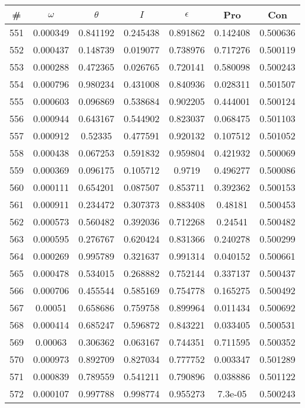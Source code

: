 \newpage
\begin{table}
\begin{tabular}{c|c|c|c|c|c|c}
\# & $\omega$ & $\theta$ & $I$ & $\epsilon$ & Pro & Con\\
\hline
551 & 0.000349 & 0.841192 & 0.245438 & 0.891862 & 0.142408 & 0.500636\\
552 & 0.000437 & 0.148739 & 0.019077 & 0.738976 & 0.717276 & 0.500119\\
553 & 0.000288 & 0.472365 & 0.026765 & 0.720141 & 0.580098 & 0.500243\\
554 & 0.000796 & 0.980234 & 0.431008 & 0.840936 & 0.028311 & 0.501507\\
555 & 0.000603 & 0.096869 & 0.538684 & 0.902205 & 0.444001 & 0.500124\\
556 & 0.000944 & 0.643167 & 0.544902 & 0.823037 & 0.068475 & 0.501103\\
557 & 0.000912 & 0.52335 & 0.477591 & 0.920132 & 0.107512 & 0.501052\\
558 & 0.000438 & 0.067253 & 0.591832 & 0.959804 & 0.421932 & 0.500069\\
559 & 0.000369 & 0.096175 & 0.105712 & 0.9719 & 0.496277 & 0.500086\\
560 & 0.000111 & 0.654201 & 0.087507 & 0.853711 & 0.392362 & 0.500153\\
561 & 0.000911 & 0.234472 & 0.307373 & 0.883408 & 0.48181 & 0.500453\\
562 & 0.000573 & 0.560482 & 0.392036 & 0.712268 & 0.24541 & 0.500482\\
563 & 0.000595 & 0.276767 & 0.620424 & 0.831366 & 0.240278 & 0.500299\\
564 & 0.000269 & 0.995789 & 0.321637 & 0.991314 & 0.040152 & 0.500661\\
565 & 0.000478 & 0.534015 & 0.268882 & 0.752144 & 0.337137 & 0.500437\\
566 & 0.000706 & 0.455544 & 0.585169 & 0.754778 & 0.165275 & 0.500492\\
567 & 0.00051 & 0.658686 & 0.759758 & 0.899964 & 0.011434 & 0.500692\\
568 & 0.000414 & 0.685247 & 0.596872 & 0.843221 & 0.033405 & 0.500531\\
569 & 0.00063 & 0.306362 & 0.063167 & 0.744351 & 0.711595 & 0.500352\\
570 & 0.000973 & 0.892709 & 0.827034 & 0.777752 & 0.003347 & 0.501289\\
571 & 0.000839 & 0.789559 & 0.541211 & 0.790896 & 0.038886 & 0.501122\\
572 & 0.000107 & 0.997788 & 0.998774 & 0.955273 & 7.3e-05 & 0.500243\\

\end{tabular}
\end{table}
